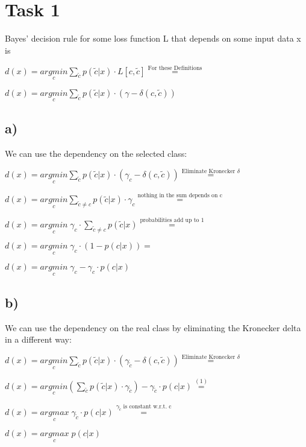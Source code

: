 \documentclass[%
   11pt,              %
   ngerman,           %
   a4paper,           %
   DIV11,             %
]{scrartcl}%
\begin{document}
\section*{Task 1}
Bayes' decision rule for some loss function L that depends on some input data x is 

$d(x) = \underset{c}{arg min} \displaystyle\sum_{\tilde{c}} p(\tilde{c}|x) \cdot L[c,\tilde{c}] \stackrel{\text{For these Definitions}}{=}$

$d(x) = \underset{c}{arg min} \displaystyle\sum_{\tilde{c}} p(\tilde{c}|x) \cdot (\gamma - \delta(c,\tilde{c}))$


\subsection*{a)}
We can use the dependency on the selected class:

$d(x) = \underset{c}{arg min} \displaystyle\sum_{\tilde{c}} p(\tilde{c}|x) \cdot (\gamma_c - \delta(c,\tilde{c})) \stackrel{\text{Eliminate Kronecker }\delta}{=}$

$d(x) = \underset{c}{arg min} \displaystyle\sum_{\tilde{c}\neq c} p(\tilde{c}|x) \cdot \gamma_c \stackrel{\text{nothing in the sum depends on c}}{=}$

$d(x) = \underset{c}{arg min} \; \gamma_c\cdot\displaystyle\sum_{\tilde{c}\neq c} p(\tilde{c}|x) \stackrel{\text{probabilities add up to 1}}{=}$

$d(x) = \underset{c}{arg min} \; \gamma_c \cdot (1 - p(c | x))=$

$d(x) = \underset{c}{arg min} \; \gamma_c - \gamma_c \cdot p(c | x)$

\subsection*{b)}
We can use the dependency on the real class by eliminating the Kronecker delta in a different way:

$d(x) = \underset{c}{arg min} \displaystyle\sum_{\tilde{c}} p(\tilde{c}|x) \cdot (\gamma_{\tilde{c}} - \delta(c,\tilde{c})) \stackrel{\text{Eliminate Kronecker }\delta}{=}$

$d(x) = \underset{c}{arg min} (\displaystyle\sum_{\tilde{c}} p(\tilde{c}|x) \cdot \gamma_{\tilde{c}}) - \gamma_{\tilde{c}} \cdot p(c|x) \stackrel{(1)}{=}$

$d(x) = \underset{c}{arg max}\;  \gamma_{\tilde{c}} \cdot p(c|x) \stackrel{\gamma_{\tilde{c}}\text{ is constant w.r.t. c}}{=}$

$d(x) = \underset{c}{arg max}\;  p(c|x)$
\end{document}
